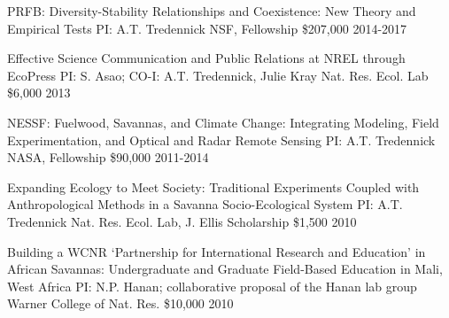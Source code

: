 

\begin{pubentries}

  \pubentry
    {PRFB: Diversity-Stability Relationships and Coexistence: New Theory and Empirical Tests} %
    {PI: A.T. Tredennick} %
    {NSF, Fellowship} %
    {\$207,000} %
    {2014-2017} %

  \pubentry
    {Effective Science Communication and Public Relations at NREL through EcoPress} %
    {PI: S. Asao; CO-I: A.T. Tredennick, Julie Kray} %
    {Nat. Res. Ecol. Lab} %
    {\$6,000} %
    {2013} %

  \pubentry
    {NESSF: Fuelwood, Savannas, and Climate Change: Integrating Modeling, Field Experimentation, and Optical and Radar Remote Sensing} %
    {PI: A.T. Tredennick} %
    {NASA, Fellowship} %
    {\$90,000} %
    {2011-2014} %

  \pubentry
    {Expanding Ecology to Meet Society: Traditional Experiments Coupled with Anthropological Methods in a Savanna Socio-Ecological System} %
    {PI: A.T. Tredennick} %
    {Nat. Res. Ecol. Lab, J. Ellis Scholarship} %
    {\$1,500} %
    {2010} %

  \pubentry
    {Building a WCNR `Partnership for International Research and Education' in African Savannas: Undergraduate and Graduate Field-Based Education in Mali, West Africa} %
    {PI: N.P. Hanan; collaborative proposal of the Hanan lab group} %
    {Warner College of Nat. Res.} %
    {\$10,000} %
    {2010} %

\end{pubentries}
